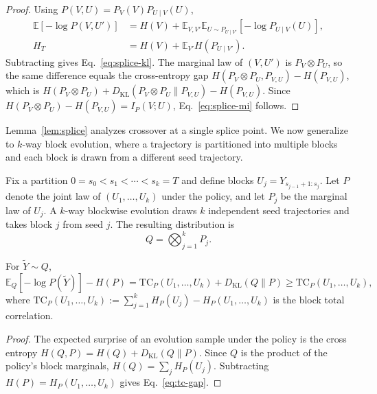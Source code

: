 \begin{proof}
Using $P(V,U)=P_V(V)P_{U\mid V}(U)$,
\begin{align}
  \mathbb{E}[-\log P(V,U')]
  &=H(V)+\mathbb{E}_{V,V'}\mathbb{E}_{U\sim P_{U\mid V'}}[-\log P_{U\mid V}(U)],\\
  H_T
  &=H(V)+\mathbb{E}_{V'}H(P_{U\mid V'}).
\end{align}
Subtracting gives Eq.~\eqref{eq:splice-kl}. The marginal law of $(V,U')$ is $P_V\otimes P_U$, so the same difference equals the cross-entropy gap $H(P_V\otimes P_U,P_{V,U})-H(P_{V,U})$, which is
$H(P_V\otimes P_U)+D_{\mathrm{KL}}(P_V\otimes P_U\|P_{V,U})-H(P_{V,U})$.
Since $H(P_V\otimes P_U)-H(P_{V,U})=I_P(V;U)$, Eq.~\eqref{eq:splice-mi} follows.
\end{proof}

Lemma~\ref{lem:splice} analyzes crossover at a single splice point. We now generalize to $k$-way block evolution, where a trajectory is partitioned into multiple blocks and each block is drawn from a different seed trajectory.

Fix a partition $0=s_0<s_1<\cdots<s_k=T$ and define blocks $U_j=Y_{s_{j-1}+1:s_j}$. Let $P$ denote the joint law of $(U_1,\ldots,U_k)$ under the policy, and let $P_j$ be the marginal law of $U_j$. A $k$-way blockwise evolution draws $k$ independent seed trajectories and takes block $j$ from seed $j$. The resulting distribution is
\begin{equation}
  Q=\bigotimes_{j=1}^{k}P_j.
  \label{eq:product-law}
\end{equation}

\begin{lemma}
\label{lem:tc}
For $\widetilde{Y}\sim Q$,
\begin{equation}
  \mathbb{E}_{Q}[-\log P(\widetilde{Y})]-H(P)
  =\mathrm{TC}_P(U_1,\ldots,U_k)+D_{\mathrm{KL}}(Q\|P)
  \ge\mathrm{TC}_P(U_1,\ldots,U_k),
  \label{eq:tc-gap}
\end{equation}
where $\mathrm{TC}_P(U_1,\ldots,U_k) := \sum_{j=1}^{k}H_P(U_j)-H_P(U_1,\ldots,U_k)$ is the block total correlation.
\end{lemma}

\begin{proof}
The expected surprise of an evolution sample under the policy is the cross entropy $H(Q,P)=H(Q)+D_{\mathrm{KL}}(Q\|P)$. Since $Q$ is the product of the policy's block marginals, $H(Q)=\sum_j H_P(U_j)$. Subtracting $H(P)=H_P(U_1,\ldots,U_k)$ gives Eq.~\eqref{eq:tc-gap}.
\end{proof}


